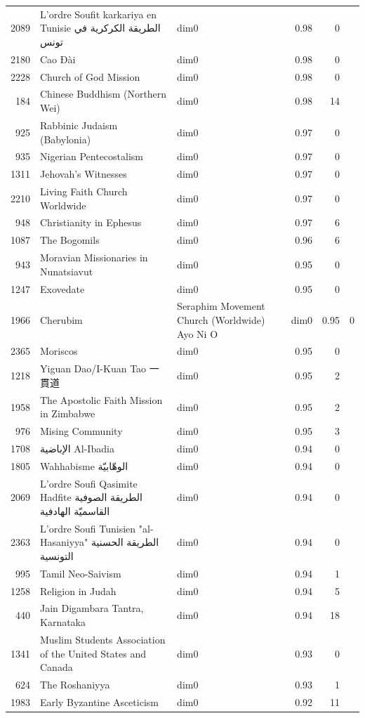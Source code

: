 \begin{tabular}{rllrr}
2089 & L'ordre Soufit karkariya en Tunisie الطريقة الكركرية في تونس & dim0 & 0.98 & 0 \\
2180 & Cao Đài & dim0 & 0.98 & 0 \\
2228 & Church of God Mission & dim0 & 0.98 & 0 \\
184 & Chinese Buddhism (Northern Wei) & dim0 & 0.98 & 14 \\
925 & Rabbinic Judaism (Babylonia) & dim0 & 0.97 & 0 \\
935 & Nigerian Pentecostalism & dim0 & 0.97 & 0 \\
1311 & Jehovah's Witnesses & dim0 & 0.97 & 0 \\
2210 & Living Faith Church Worldwide & dim0 & 0.97 & 0 \\
948 & Christianity in Ephesus & dim0 & 0.97 & 6 \\
1087 & The Bogomils & dim0 & 0.96 & 6 \\
943 & Moravian Missionaries in Nunatsiavut & dim0 & 0.95 & 0 \\
1247 & Exovedate & dim0 & 0.95 & 0 \\
1966 & Cherubim & Seraphim Movement Church (Worldwide) Ayo Ni O & dim0 & 0.95 & 0 \\
2365 & Moriscos & dim0 & 0.95 & 0 \\
1218 & Yiguan Dao/I-Kuan Tao 一貫道 & dim0 & 0.95 & 2 \\
1958 & The Apostolic Faith Mission in Zimbabwe & dim0 & 0.95 & 2 \\
976 & Mising Community & dim0 & 0.95 & 3 \\
1708 & الإباضية  Al-Ibadia & dim0 & 0.94 & 0 \\
1805 & Wahhabisme الوهّابيّة & dim0 & 0.94 & 0 \\
2069 & L'ordre Soufi Qasimite Hadfite الطريقة الصوفية القاسميّة الهادفية & dim0 & 0.94 & 0 \\
2363 & L'ordre Soufi Tunisien "al-Hasaniyya" الطريقة الحسنية التونسية & dim0 & 0.94 & 0 \\
995 & Tamil Neo-Saivism & dim0 & 0.94 & 1 \\
1258 & Religion in Judah & dim0 & 0.94 & 5 \\
440 & Jain Digambara Tantra, Karnataka & dim0 & 0.94 & 18 \\
1341 & Muslim Students Association of the United States and Canada & dim0 & 0.93 & 0 \\
624 & The Roshaniyya & dim0 & 0.93 & 1 \\
1983 & Early Byzantine Asceticism & dim0 & 0.92 & 11 \\

\end{tabular}
